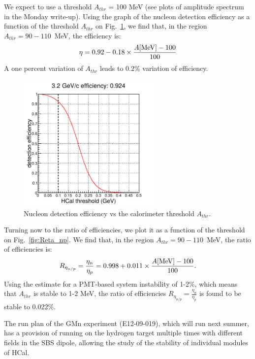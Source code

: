 \documentclass[11pt]{article}
\begin{document}
We expect to use a threshold $A_{thr}$ = 100 MeV (see plots of amplitude spectrum in the Monday write-up).
Using the graph of the nucleon detection efficiency as a function of the threshold $A_{thr}$ on Fig.~\ref{fig:eta_N},
we find that, in the region $A_{thr} = 90 - 110$~MeV, the efficiency is:
%
\begin{equation}
  \eta = 0.92 - 0.18 \times \frac{A[{\rm MeV}]-100}{100}
\end{equation}
%
A one percent variation of $A_{thr}$ leads to 0.2\% variation of efficiency.
%
\begin{figure}[!h]
  \centering
  \includegraphics[width=7cm]{Neff_fThr.pdf}
  \caption{Nucleon detection efficiency vs the calorimeter threshold $A_{thr}$.}
  \label{fig:eta_N}
\end{figure}
%

Turning now to the ratio of efficiencies, we plot it as a function of the threshold on Fig.~\ref{fig:Reta_np}.
We find that, in the region $A_{thr} = 90 - 110$~MeV, the ratio of efficiencies is:
%
\begin{equation}
  R_{\eta_{n/p}} = \frac{\eta_n}{\eta_p} = 0.998 + 0.011 \times \frac{A[{\rm MeV}]-100}{100}.
\end{equation}
%
Using the estimate for a PMT-based system instability of 1-2\%, which means that $A_{thr}$ is stable to 1-2 MeV,
the ratio of efficiencies $R_{\eta_{n/p}} = \frac{\eta_n}{\eta_p}$ is found to be stable to 0.022\%.

The run plan of the GMn experiment (E12-09-019), which will run next summer,
has a provision of running on the hydrogen target multiple times with different fields in the SBS dipole,
allowing the study of the stability of individual modules of HCal.
\end{document}
